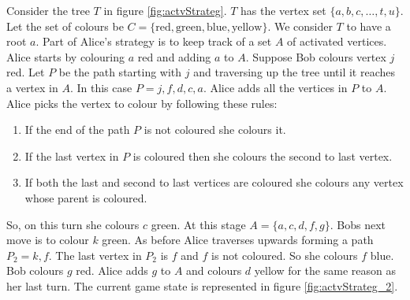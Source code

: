 Consider the tree $T$ in figure \ref{fig:actvStrateg}. $T$ has the vertex set $\{a,b,c,\dots,t,u\}$. Let the set of colours be $C=\{\text{red},\text{green},\text{blue},\text{yellow}\}$. We consider $T$ to have a root $a$. Part of Alice's strategy is to keep track of a set $A$ of activated vertices. Alice starts by colouring $a$ red and adding $a$ to $A$. Suppose Bob colours vertex $j$ red. 
Let $P$ be the path starting with $j$ and traversing up the tree until it reaches a vertex in $A$. In this case $P= j, f, d, c, a$. Alice adds all the vertices in $P$ to $A$. Alice picks the vertex to colour by following these rules:
%
\begin{enumerate}
    \item If the end of the path $P$ is not coloured she colours it. 
    \item If the last vertex in $P$ is coloured then she colours the second to last vertex. 
    \item If both the last and second to last vertices are coloured she colours any vertex whose parent is coloured. 
\end{enumerate}
%
So, on this turn she colours $c$ green. At this stage $A=\{a,c,d,f,g\}$. Bobs next move is to colour $k$ green. As before Alice traverses upwards forming a path $P_2=k,f$. The last vertex in $P_2$ is $f$ and $f$ is not coloured. So she colours $f$ blue. Bob colours $g$ red. Alice adds $g$ to $A$ and colours $d$ yellow for the same reason as her last turn. The current game state is represented in figure \ref{fig:actvStrateg_2}.
